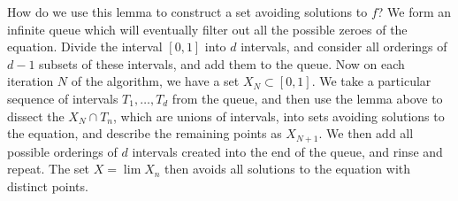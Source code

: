 \documentclass{report}
\theoremstyle{plain}
\theoremstyle{plain}
\begin{document}
How do we use this lemma to construct a set avoiding solutions to $f$? We form an infinite queue which will eventually filter out all the possible zeroes of the equation. Divide the interval $[0,1]$ into $d$ intervals, and consider all orderings of $d - 1$ subsets of these intervals, and add them to the queue. Now on each iteration $N$ of the algorithm, we have a set $X_N \subset [0,1]$. We take a particular sequence of intervals $T_1, \dots, T_d$ from the queue, and then use the lemma above to dissect the $X_N \cap T_n$, which are unions of intervals, into sets avoiding solutions to the equation, and describe the remaining points as $X_{N+1}$. We then add all possible orderings of $d$ intervals created into the end of the queue, and rinse and repeat. The set $X = \lim X_n$ then avoids all solutions to the equation with distinct points.
\end{document}

